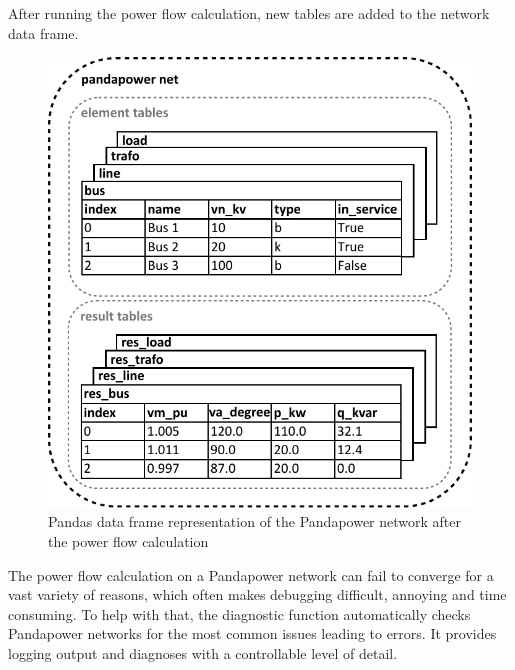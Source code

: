 
After running the power flow calculation, new tables are added to the network data frame.
\begin{figure}[H]
\centering
    \includegraphics[width=.6\linewidth]{images/Background/Pandapower/Pandapower_resnet_big.pdf}
\caption{Pandas data frame representation of the Pandapower network after the power flow calculation}
\end{figure}

The power flow calculation on a Pandapower network can fail to converge for a vast variety of reasons, which often makes debugging difficult, annoying and time consuming. To help with that, the diagnostic function automatically checks Pandapower networks for the most common issues leading to errors. It provides logging output and diagnoses with a controllable level of detail.





